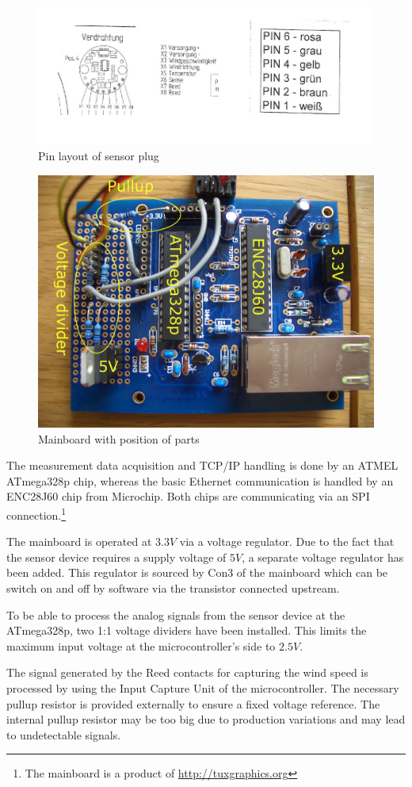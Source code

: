 \begin{figure}[ht]
    \centering
    \includegraphics[width=0.6\linewidth]{graphics/pinlayout.jpg}
    \caption{Pin layout of sensor plug}
    \label{fig:pinlayout}
\end{figure}

\begin{figure}[ht]
    \centering
    \includegraphics[width=0.6\linewidth]{graphics/mainboard.jpg}
    \caption{Mainboard with position of parts}
    \label{fig:mainboard}
\end{figure}

The measurement data acquisition and TCP/IP handling is done by an ATMEL ATmega328p chip, whereas the basic Ethernet communication is handled by an ENC28J60 chip from Microchip. Both chips are communicating via an SPI connection.\footnote{The mainboard is a product of \url{http://tuxgraphics.org}} 

The mainboard is operated at $3.3 V$ via a voltage regulator. Due to the fact that the sensor device requires a supply voltage of $5 V$, a separate voltage regulator has been added. This regulator is sourced by Con3 of the mainboard which can be switch on and off by software via the transistor connected upstream.

To be able to process the analog signals from the sensor device at the ATmega328p, two 1:1 voltage dividers have been installed. This limits the maximum input voltage at the microcontroller's side to $2.5 V$.

The signal generated by the Reed contacts for capturing the wind speed is processed by using the Input Capture Unit of the microcontroller. The necessary pullup resistor is provided externally to ensure a fixed voltage reference. The internal pullup resistor may be too big due to production variations and may lead to undetectable signals.

